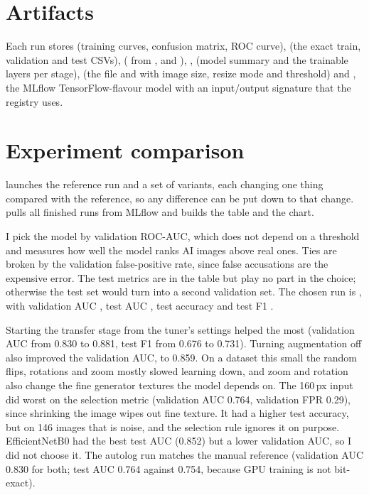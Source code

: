 \section{Artifacts}
Each run stores  (training curves, confusion matrix, ROC curve),  (the
exact train, validation and test CSVs),  ( from
, and ), ,
 (model summary and the trainable layers per stage),  (the
 file and  with image size, resize mode and threshold) and
, the MLflow TensorFlow-flavour model with an input/output signature that the registry
uses.


\section{Experiment comparison}\label{sec:3-5}
 launches the reference run and a set of variants, each changing
one thing compared with the reference, so any difference can be put down to that change.
 pulls all finished runs from MLflow and builds the table and the
chart.


I pick the model by validation ROC-AUC, which does not depend on a threshold and measures how well
the model ranks AI images above real ones. Ties are broken by the validation false-positive rate,
since false accusations are the expensive error. The test metrics are in the table but play no part
in the choice; otherwise the test set would turn into a second validation set. The chosen run is
\texttt{\vgBestRun}, with validation AUC \vgBestValAuc, test AUC \vgBestTestAuc, test accuracy
\vgBestTestAcc{} and test F1 \vgBestTestFone.

Starting the transfer stage from the tuner's settings helped the most (validation AUC from 0.830 to
0.881, test F1 from 0.676 to 0.731). Turning augmentation off also improved the validation AUC, to
0.859. On a dataset this small the random flips, rotations and zoom mostly slowed learning down,
and zoom and rotation also change the fine generator textures the model depends on. The 160\,px
input did worst on the selection metric (validation AUC 0.764, validation FPR 0.29), since
shrinking the image wipes out fine texture. It had a higher test accuracy, but on 146 images that
is noise, and the selection rule ignores it on purpose. EfficientNetB0 had the best test AUC
(0.852) but a lower validation AUC, so I did not choose it. The autolog run matches the manual
reference (validation AUC 0.830 for both; test AUC 0.764 against 0.754, because GPU training is
not bit-exact).

